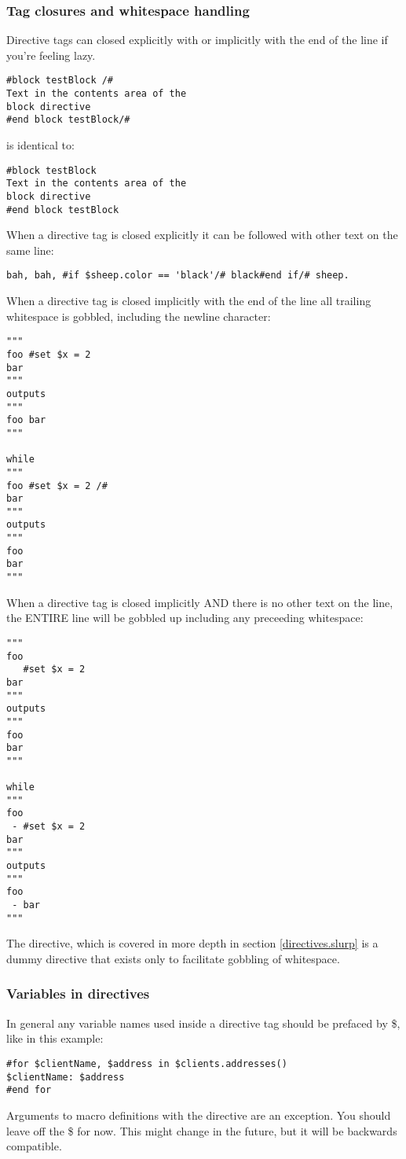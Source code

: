 \subsubsection{Tag closures and whitespace handling}
\label{TDL.directives.closures}
Directive tags can closed explicitly with \code{/\#} or implicitly with the end
of the line if you're feeling lazy.

\begin{verbatim}
#block testBlock /#
Text in the contents area of the
block directive
#end block testBlock/#
\end{verbatim}
is identical to:
\begin{verbatim}
#block testBlock
Text in the contents area of the
block directive
#end block testBlock
\end{verbatim}

When a directive tag is closed explicitly it can be followed with other text on
the same line:

\begin{verbatim}
bah, bah, #if $sheep.color == 'black'/# black#end if/# sheep.
\end{verbatim}

When a directive tag is closed implicitly with the end of the line all trailing
whitespace is gobbled, including the newline character:
\begin{verbatim}
"""
foo #set $x = 2 
bar
"""
outputs 
"""
foo bar
"""

while 
"""
foo #set $x = 2 /#
bar
"""
outputs 
"""
foo 
bar
"""
\end{verbatim}

When a directive tag is closed implicitly AND there is no other text on the
line, the ENTIRE line will be gobbled up including any preceeding whitespace:
\begin{verbatim}
"""
foo 
   #set $x = 2 
bar
"""
outputs 
"""
foo
bar
"""

while 
"""
foo 
 - #set $x = 2
bar
"""
outputs 
"""
foo 
 - bar
"""
\end{verbatim}

The  directive, which is covered in more depth in section
\ref{directives.slurp} is a dummy directive that exists only to facilitate
gobbling of whitespace.

\subsubsection{Variables in directives}
\label{TDL.directives.variables}

In general any variable names used inside a directive tag should be prefaced by
\$, like in this example:

\begin{verbatim}
#for $clientName, $address in $clients.addresses()
$clientName: $address
#end for
\end{verbatim}

Arguments to macro definitions with the  directive are an exception.  You
should leave off the \$ for now.  This might change in the future, but it will
be backwards compatible.
